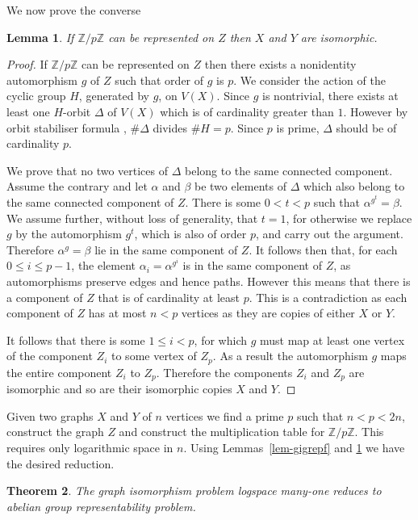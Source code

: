 \documentclass[a4paper,11pt]{article}
\newtheorem{theorem}{Theorem}[section]
\newtheorem{lemma}[theorem]{Lemma}
\newcommand{\pcyc}{\mathbb{Z}/p\mathbb{Z}}
\begin{document}
We now prove the converse
\begin{lemma}\label{lem-gigrepb}
  If $\pcyc$ can be represented on $Z$ then $X$ and $Y$ are
  isomorphic.
\end{lemma}
\begin{proof}
  If $\pcyc$ can be represented on $Z$ then there exists a nonidentity
  automorphism $g$ of $Z$ such that order of $g$ is $p$. We consider
  the action of the cyclic group $H$, generated by $g$, on $V(X)$. Since
  $g$ is nontrivial, there exists at least one $H$-orbit $\Delta$ of
  $V(X)$ which is of cardinality greater than $1$. However by orbit
  stabiliser formula \cite[Theorem 3.2]{wielandt64finite}, $\# \Delta$
  divides $\# H = p$. Since $p$ is prime, $\Delta$ should be of
  cardinality $p$.

  We prove that no two vertices of $\Delta$ belong to the same
  connected component. Assume the contrary and let $\alpha$ and
  $\beta$ be two elements of $\Delta$ which also belong to the same
  connected component of $Z$. There is some $0 < t < p$ such that
  $\alpha^{g^t} = \beta$. We assume further, without loss of
  generality, that $t=1$, for otherwise we replace $g$ by the
  automorphism $g^t$, which is also of order $p$, and carry out the
  argument. Therefore $\alpha^g = \beta$ lie in the same component of
  $Z$. It follows then that, for each $0 \leq i \leq p -1 $, the element
  $\alpha_i = \alpha^{g^i}$ is in the same component of $Z$, as
  automorphisms preserve edges and hence paths. However this means
  that there is a component of $Z$ that is of cardinality at least
  $p$. This is a contradiction as each component of $Z$ has at most $n
  < p$ vertices as they are copies of either $X$ or $Y$.

  It follows that there is some $1 \leq i < p$, for which $g$ must map
  at least one vertex of the component $Z_i$ to some vertex of
  $Z_p$. As a result the automorphism $g$ maps the entire component
  $Z_i$ to $Z_p$.  Therefore the components $Z_i$ and $Z_p$ are
  isomorphic and so are their isomorphic copies $X$ and $Y$.
\end{proof}

Given two graphs $X$ and $Y$ of $n$ vertices we find a prime $p$ such
that $n < p < 2n$, construct the graph $Z$ and construct the
multiplication table for $\pcyc$. This requires only logarithmic space
in $n$. Using Lemmas~\ref{lem-gigrepf} and \ref{lem-gigrepb} we have
the desired reduction.

\begin{theorem}
  The graph isomorphism problem logspace many-one reduces to abelian
  group representability problem.
\end{theorem}
\end{document}
